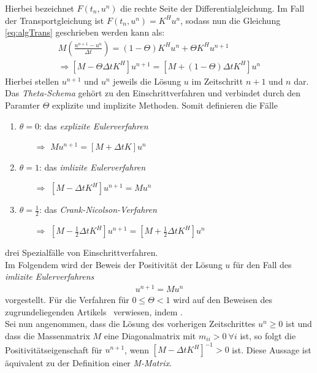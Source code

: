 \documentclass[a4paper,11pt]{article}
\begin{document}
Hierbei bezeichnet $F(t_n,u^n)$ die rechte Seite der Differentialgleichung. Im Fall der Transportgleichung ist $F(t_n,u^n)=K^Hu^n$, sodass nun die Gleichung \eqref{eq:algTrans} geschrieben werden kann als:
\begin{align}
 M(\frac{u^{n+1}-u^n}{\Delta t})=(1-\Theta)K^Hu^n+\Theta K^Hu^{n+1}\nonumber\\
\Rightarrow [M-\Theta\Delta tK^H]u^{n+1}=[M+(1-\Theta)\Delta tK^H]u^n
\end{align}
Hierbei stellen $u^{n+1}$ und $u^n$ jeweils die Lösung $u$ im Zeitschritt $n+1$  und $n$ dar. Das \textit{Theta-Schema} gehört zu den Einschrittverfahren und verbindet durch den Paramter $\Theta$ explizite und implizite Methoden. Somit definieren die Fälle
\begin{enumerate}
 \item $\theta=0$: das \textit{explizite Eulerverfahren}
 \begin{enumerate}
  \item[$\Rightarrow$] $Mu^{n+1}=[M+\Delta tK]u^n$
 \end{enumerate}
 \item $\theta=1$:    das \textit{imlizite Eulerverfahren}
 \begin{enumerate}
  \item[$\Rightarrow$] $[M-\Delta tK^H]u^{n+1}=Mu^n$
 \end{enumerate}
 \item $\theta=\frac{1}{2}$:  das \textit{Crank-Nicolson-Verfahren}
 \begin{enumerate}
  \item[$\Rightarrow$] $[M-\frac{1}{2}\Delta tK^H]u^{n+1}=[M+\frac{1}{2}\Delta tK^H]u^n$
 \end{enumerate}
\end{enumerate}
drei Spezialfälle von Einschrittverfahren.\\
Im Folgendem wird der Beweis der Positivität der Lösung $u$ für den Fall des \textit{imlizite Eulerverfahrens}
\begin{align}
 [M-\Delta tK^H]u^{n+1}=Mu^n\label{eq:LGS_H}
\end{align}
vorgestellt. Für die Verfahren für $0\le\Theta<1$ wird auf den Beweisen des zugrundeliegenden Artikels~\cite{kuzmin2002flux} verwiesen, indem .\\
Sei nun angenommen, dass die Lösung des vorherigen Zeitschrittes $u^n\ge0$ ist und dass die Massenmatrix $M$ eine Diagonalmatrix mit $m_{ii}>0~\forall i$ ist, so folgt die Positivitätseigenschaft für $u^{n+1}$, wenn $[M-\Delta tK^H]^{-1}>0$ ist. Diese Aussage ist äquivalent zu der Definition einer \textit{M-Matrix}.
\end{document}
